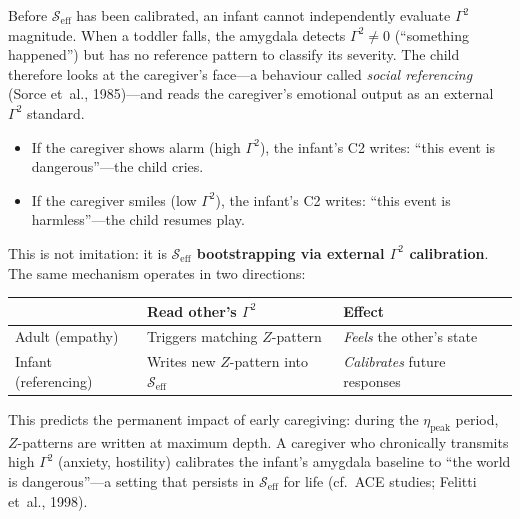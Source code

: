 \documentclass[aps,pre,twocolumn,superscriptaddress,floatfix]{revtex4-2}
\begin{document}
\begin{remark}
\label{rem:social-referencing}
Before $\mathcal{S}_{\text{eff}}$ has been calibrated,
an infant cannot independently evaluate $\Gamma^2$
magnitude.
When a toddler falls, the amygdala detects
$\Gamma^2 \neq 0$ (``something happened'')
but has no reference pattern to classify its severity.
The child therefore looks at the caregiver's face---a
behaviour called \emph{social referencing}
(Sorce et~al., 1985)---and reads the caregiver's
emotional output as an external $\Gamma^2$ standard.

\begin{itemize}
  \item If the caregiver shows alarm (high $\Gamma^2$),
    the infant's C2 writes:
    ``this event is dangerous''---the child cries.
  \item If the caregiver smiles (low $\Gamma^2$),
    the infant's C2 writes:
    ``this event is harmless''---the child resumes play.
\end{itemize}

This is not imitation: it is
\textbf{$\mathcal{S}_{\text{eff}}$ bootstrapping
via external $\Gamma^2$ calibration}.
The same mechanism operates in two directions:
\begin{center}
\begin{tabular}{lll}
\toprule
& Read other's $\Gamma^2$ & Effect \\
\midrule
Adult (empathy) &
  Triggers matching $Z$-pattern &
  \emph{Feels} the other's state \\
Infant (referencing) &
  Writes new $Z$-pattern into $\mathcal{S}_{\text{eff}}$ &
  \emph{Calibrates} future responses \\
\bottomrule
\end{tabular}
\end{center}

This predicts the permanent impact of early
caregiving: during the $\eta_{\text{peak}}$ period,
$Z$-patterns are written at maximum depth.
A caregiver who chronically transmits high $\Gamma^2$
(anxiety, hostility) calibrates the infant's
amygdala baseline to ``the world is dangerous''---a
setting that persists in $\mathcal{S}_{\text{eff}}$
for life (cf.\ ACE studies; Felitti et~al., 1998).
\end{remark}
\end{document}
